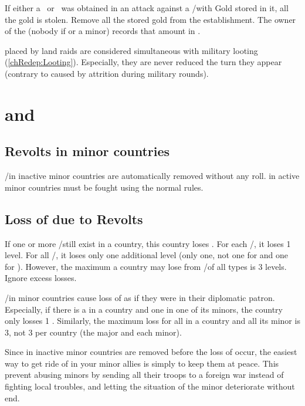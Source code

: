 \bparag If either a \textdag\ or \textddag\ was obtained in an attack against
a \COL/\TP with Gold stored in it, all the gold is stolen.
\bparag Remove all the stored gold from the establishment.
\bparag The owner of the \corsaire (nobody if  or a minor)
records that amount in .

\bparag \PILLAGE placed by land raids are considered simultaneous with
military looting (\ref{chRedep:Looting}).
\bparag Especially, they are never reduced the turn they appear (contrary to
\PILLAGE caused by attrition during military rounds).

\section{\REVOLT and \REBELLION}\label{chRedep:Revolts}
\subsection{Revolts in minor countries}
\aparag \REVOLT/\REBELLION in inactive minor countries are automatically
removed without any roll.
\bparag \REVOLT in active minor countries must be fought using the normal
rules.

\subsection{Loss of \STAB due to Revolts}
\label{chRedep:Revolts Stability}
\aparag If one or more \REVOLT/\REBELLION still exist in a country, this
country loses \STAB.
\bparag For each \REVOLT/\REBELLION\faceplus, it loses 1 \STAB level.
\bparag For all \REVOLT/\REBELLION\facemoins, it loses only one additional
\STAB level (only one, not one for \REVOLT and one for \REBELLION).
\aparag However, the maximum a country may lose from \REVOLT/\REBELLION of all
types is 3 \STAB levels. Ignore excess losses.

\aparag \REVOLT/\REBELLION in minor countries cause loss of \STAB as if they
were in their diplomatic patron.
\bparag Especially, if there is a \REVOLT\Facemoins in a country and one in
one of its minors, the country only losses 1 \STAB.
\bparag Similarly, the maximum loss for all \REVOLT in a country and all its
minor is 3, not 3 per country (the major and each minor).

\begin{designnote}
  Since \REVOLT in inactive minor countries are removed before the loss of
  \STAB occur, the easiest way to get ride of \REVOLT in your minor allies is
  simply to keep them at peace. This prevent abusing minors by sending all
  their troops to a foreign war instead of fighting local troubles, and
  letting the situation of the minor deteriorate without end.
\end{designnote}

